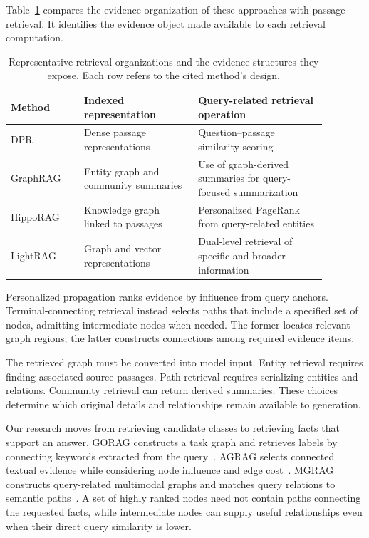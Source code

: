 Table~\ref{tab:background:retrieval-units} compares the evidence organization of these approaches with passage retrieval. It identifies the evidence object made available to each retrieval computation.

\begin{table}[tbp]
\centering
\caption{Representative retrieval organizations and the evidence structures they expose. Each row refers to the cited method's design.}
\label{tab:background:retrieval-units}
\small
\begin{tabular}{p{0.20\linewidth}p{0.32\linewidth}p{0.36\linewidth}}
\toprule
Method&Indexed representation&Query-related retrieval operation\\
\midrule
DPR~\cite{bg-dpr}&Dense passage representations&Question--passage similarity scoring\\
GraphRAG~\cite{bg-graphrag}&Entity graph and community summaries&Use of graph-derived summaries for query-focused summarization\\
HippoRAG~\cite{bg-hipporag}&Knowledge graph linked to passages&Personalized PageRank from query-related entities\\
LightRAG~\cite{bg-lightrag}&Graph and vector representations&Dual-level retrieval of specific and broader information\\
\bottomrule
\end{tabular}
\end{table}

Personalized propagation ranks evidence by influence from query anchors. Terminal-connecting retrieval instead selects paths that include a specified set of nodes, admitting intermediate nodes when needed. The former locates relevant graph regions; the latter constructs connections among required evidence items.

The retrieved graph must be converted into model input. Entity retrieval requires finding associated source passages. Path retrieval requires serializing entities and relations. Community retrieval can return derived summaries. These choices determine which original details and relationships remain available to generation.

Our research moves from retrieving candidate classes to retrieving facts that support an answer. GORAG constructs a task graph and retrieves labels by connecting keywords extracted from the query~\cite{bg-gorag}. AGRAG selects connected textual evidence while considering node influence and edge cost~\cite{bg-agrag}. MGRAG constructs query-related multimodal graphs and matches query relations to semantic paths~\cite{bg-mgrag}. A set of highly ranked nodes need not contain paths connecting the requested facts, while intermediate nodes can supply useful relationships even when their direct query similarity is lower.

